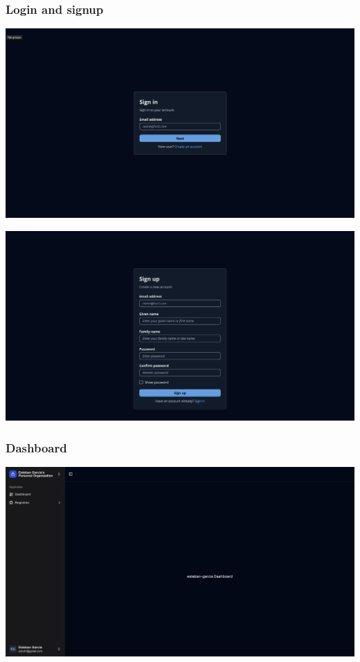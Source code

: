 \documentclass{article}
\begin{document}
  \subsubsection{Login and signup}

  \includegraphics[scale=0.28]{screenshots/signin.png}

  \includegraphics[scale=0.28]{screenshots/signup.png}

  \subsubsection{Dashboard}

  \includegraphics[scale=0.28]{screenshots/dashboard.png} 
\end{document}
